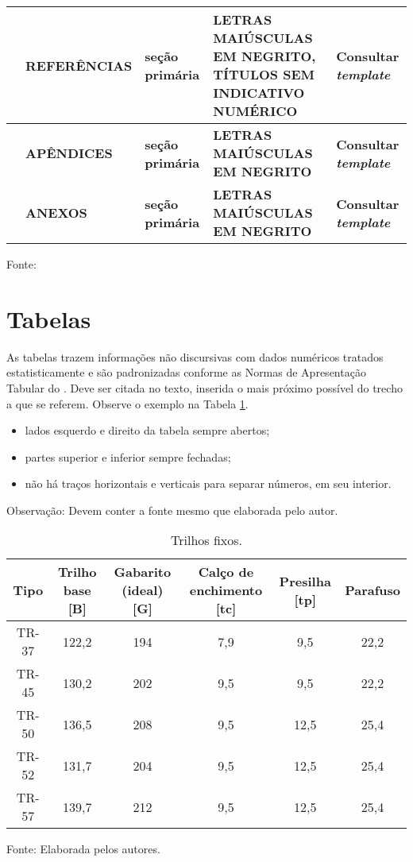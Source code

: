 \begin{quadro}[H]
\begin{tabularx}{\columnwidth}{|X|X|X|X|X|}
		& \textbf{REFERÊNCIAS} & \textbf{seção primária} & \textbf{LETRAS MAIÚSCULAS EM NEGRITO, TÍTULOS SEM INDICATIVO NUMÉRICO} & \textbf{Consultar \textit{template}} \\ \hline
		
		& \textbf{APÊNDICES} & \textbf{seção primária} & \textbf{LETRAS MAIÚSCULAS EM NEGRITO} & \textbf{Consultar \textit{template}} \\ \hline
		
		& \textbf{ANEXOS} & \textbf{seção primária} & \textbf{LETRAS MAIÚSCULAS EM NEGRITO} & \textbf{Consultar \textit{template}}\\ \hline
		
	\end{tabularx} \label{quadro:ex}
	\raggedright 
	{\small Fonte: }
\end{quadro}



\section {Tabelas}
As tabelas trazem informações não discursivas com dados numéricos tratados estatisticamente e são padronizadas conforme as Normas de Apresentação Tabular do . Deve ser citada no texto, inserida o mais próximo possível do trecho a que se referem. Observe o exemplo na Tabela \ref{tab:ex}.
\begin{itemize}
	\item lados esquerdo e direito da tabela sempre abertos;
	\item partes superior e inferior sempre fechadas;
	\item não há traços horizontais e verticais para separar números, em seu interior.
\end{itemize}

Observação: Devem conter a fonte mesmo que elaborada pelo autor.

\begin{table}[H]
	\centering
	\caption{Trilhos fixos.}
	\begin{tabular}{c|c|c|c|c|c}
		\hline
		Tipo & Trilho base [B] & Gabarito (ideal) [G] & Calço de enchimento [tc] & Presilha [tp] & Parafuso \\
		\hline 
		TR-37 & 122,2 & 194 & 7,9 & 9,5 & 22,2 \\
		TR-45 & 130,2 & 202 & 9,5 & 9,5 & 22,2 \\
		TR-50 & 136,5 & 208 & 9,5 & 12,5 & 25,4 \\
		TR-52 & 131,7 & 204 & 9,5 & 12,5 & 25,4 \\
		TR-57 & 139,7 & 212 & 9,5 & 12,5 & 25,4 \\
		\hline
	\end{tabular}
	\raggedright
	{\small Fonte: Elaborada pelos autores.}
	\label{tab:ex}
\end{table}
